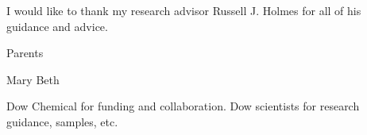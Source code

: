 \documentclass[../thesis.tex]{subfiles}
\begin{document}
I would like to thank my research advisor Russell J. Holmes for all of his guidance and advice.

Parents

Mary Beth

Dow Chemical for funding and collaboration.  Dow scientists for research guidance, samples, etc.
\end{document}

